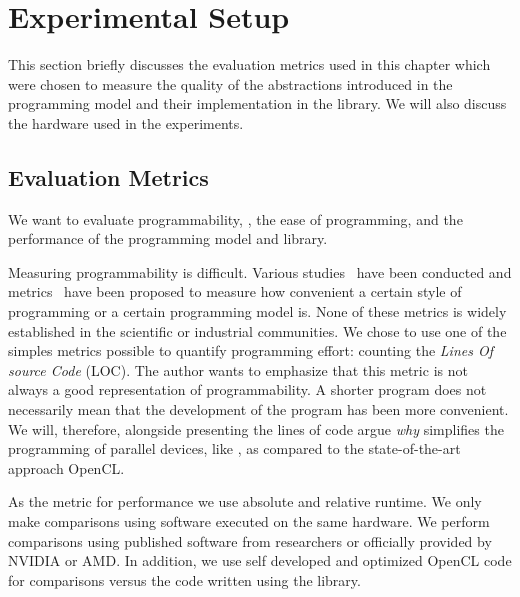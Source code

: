 \section{Experimental Setup}
\label{sec:skelcl:experimental_setup}
This section briefly discusses the evaluation metrics used in this chapter which were chosen to measure the quality of the abstractions introduced in the \SkelCL programming model and their implementation in the \SkelCL library.
We will also discuss the hardware used in the experiments.


\subsection{Evaluation Metrics}
We want to evaluate programmability, \ie, the ease of programming, and the performance of the \SkelCL programming model and library.

Measuring programmability is difficult.
Various studies~\cite{HochsteinCSAB2005,HochsteinBVG2008} have been conducted and metrics~\cite{VanderwielNL1997} have been proposed to measure how convenient a certain style of programming or a certain programming model is.
None of these metrics is widely established in the scientific or industrial communities.
We chose to use one of the simples metrics possible to quantify programming effort: counting the \emph{Lines Of source Code} (LOC).
The author wants to emphasize that this metric is not always a good representation of programmability.
A shorter program does not necessarily mean that the development of the program has been more convenient.
We will, therefore, alongside presenting the lines of code argue \emph{why} \SkelCL simplifies the programming of parallel devices, like \GPUs, as compared to the state-of-the-art approach OpenCL.

As the metric for performance we use absolute and relative runtime.
We only make comparisons using software executed on the same hardware.
We perform comparisons using published software from researchers or officially provided by NVIDIA or AMD.
In addition, we use self developed and optimized OpenCL code for comparisons versus the code written using the \SkelCL library.

